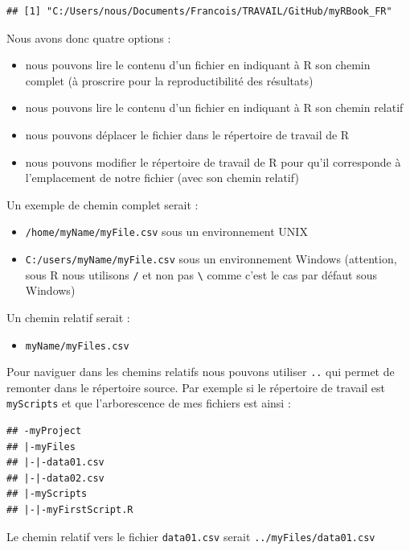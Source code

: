 \documentclass[]{book}
\providecommand{\tightlist}{%
  \setlength{\itemsep}{0pt}\setlength{\parskip}{0pt}}
\begin{document}
\begin{verbatim}
## [1] "C:/Users/nous/Documents/Francois/TRAVAIL/GitHub/myRBook_FR"
\end{verbatim}

Nous avons donc quatre options :

\begin{itemize}
\tightlist
\item
  nous pouvons lire le contenu d'un fichier en indiquant à R son chemin complet (à proscrire pour la reproductibilité des résultats)
\item
  nous pouvons lire le contenu d'un fichier en indiquant à R son chemin relatif
\item
  nous pouvons déplacer le fichier dans le répertoire de travail de R
\item
  nous pouvons modifier le répertoire de travail de R pour qu'il corresponde à l'emplacement de notre fichier (avec son chemin relatif)
\end{itemize}

Un exemple de chemin complet serait :

\begin{itemize}
\tightlist
\item
  \texttt{/home/myName/myFile.csv} sous un environnement UNIX
\item
  \texttt{C:/users/myName/myFile.csv} sous un environnement Windows (attention, sous R nous utilisons \texttt{/} et non pas \texttt{\textbackslash{}} comme c'est le cas par défaut sous Windows)
\end{itemize}

Un chemin relatif serait :

\begin{itemize}
\tightlist
\item
  \texttt{myName/myFiles.csv}
\end{itemize}

Pour naviguer dans les chemins relatifs nous pouvons utiliser \texttt{..} qui permet de remonter dans le répertoire source. Par exemple si le répertoire de travail est \texttt{myScripts} et que l'arborescence de mes fichiers est ainsi :

\begin{verbatim}
## -myProject
## |-myFiles
## |-|-data01.csv
## |-|-data02.csv
## |-myScripts
## |-|-myFirstScript.R
\end{verbatim}

Le chemin relatif vers le fichier \texttt{data01.csv} serait \texttt{../myFiles/data01.csv}
\end{document}
